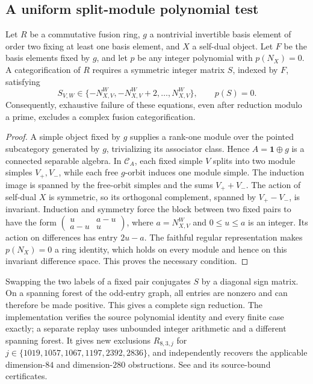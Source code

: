 \subsection{A uniform split-module polynomial test}
\label{subsec:m3-split-polynomial}
\begin{proposition}
Let $R$ be a commutative fusion ring, $g$ a nontrivial invertible basis
element of order two fixing at least one basis element, and $X$ a self-dual
object. Let $F$ be the basis elements fixed by $g$, and let $p$ be any
integer polynomial with $p(N_X)=0$. A categorification of $R$ requires a
symmetric integer matrix $S$, indexed by $F$, satisfying
\[
 S_{V,W}\in\{-N_{X,V}^{W},-N_{X,V}^{W}+2,\ldots,N_{X,V}^{W}\},
 \qquad p(S)=0.
\]
Consequently, exhaustive failure of these equations, even after reduction
modulo a prime, excludes a complex fusion categorification.
\end{proposition}
\begin{proof}
A simple object fixed by $g$ supplies a rank-one module over the pointed
subcategory generated by $g$, trivializing its associator class. Hence
$A=\mathbf1\oplus g$ is a connected separable algebra. In $\mathcal C_A$,
each fixed simple $V$ splits into two module simples $V_+,V_-$, while each
free $g$-orbit induces one module simple. The induction image is spanned by
the free-orbit simples and the sums $V_++V_-$. The action of self-dual $X$
is symmetric, so its orthogonal complement, spanned by $V_+-V_-$, is
invariant. Induction and symmetry force the block between two fixed pairs
to have the form
$\left(\begin{smallmatrix}u&a-u\\a-u&u\end{smallmatrix}\right)$,
where $a=N_{X,V}^{W}$ and $0\leq u\leq a$ is an integer. Its action on
differences has entry $2u-a$. The faithful regular representation makes
$p(N_X)=0$ a ring identity, which holds on every module and hence on this
invariant difference space. This proves the necessary condition.
\end{proof}
Swapping the two labels of a fixed pair conjugates $S$ by a diagonal sign
matrix. On a spanning forest of the odd-entry graph, all entries are
nonzero and can therefore be made positive. This gives a complete sign
reduction. The implementation verifies the source polynomial identity
and every finite case exactly; a separate replay uses unbounded integer
arithmetic and a different spanning forest. It gives new exclusions
$R_{8,3,j}$ for
$j\in\{1019,1057,1067,1197,2392,2836\}$, and independently recovers the
applicable dimension-$84$ and dimension-$280$ obstructions. See
 and its source-bound
certificates.
